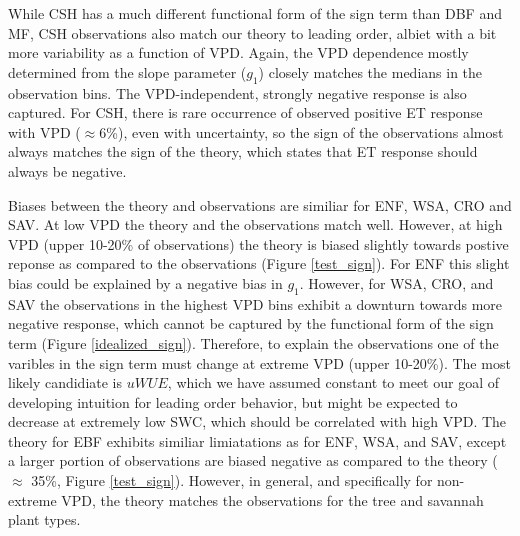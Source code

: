 \documentclass[draft,linenumbers]{agujournal}
\begin{document}
While CSH has a much different functional form of the sign term than DBF and MF, CSH observations also match our theory to leading order, albiet with a bit more variability as a function of VPD. Again, the VPD dependence mostly determined from the slope parameter ($g_1$) closely matches the medians in the observation bins. The VPD-independent, strongly negative response is also captured. For CSH, there is rare occurrence of observed positive ET response with VPD ($\approx 6$\%), even with uncertainty, so the sign of the observations almost always matches the sign of the theory, which states that ET response should always be negative.

Biases between the theory and observations are similiar for ENF, WSA, CRO and SAV. At low VPD the theory and the observations match well. However, at high VPD (upper 10-20\% of observations) the theory is biased slightly towards postive reponse as compared to the observations (Figure \ref{test_sign}). For ENF this slight bias could be explained by a negative bias in $g_1$. However, for WSA, CRO, and SAV the observations in the highest VPD bins exhibit a downturn towards more negative response, which cannot be captured by the functional form of the sign term (Figure \ref{idealized_sign}). Therefore, to explain the observations one of the varibles in the sign term must change at extreme VPD (upper 10-20\%). The most likely candidiate is $uWUE$, which we have assumed constant to meet our goal of developing intuition for leading order behavior, but might be expected to decrease at extremely low SWC, which should be correlated with high VPD. The theory for EBF exhibits similiar limiatations as for ENF, WSA, and SAV, except a larger portion of observations are biased negative as compared to the theory ($\approx$ 35\%, Figure \ref{test_sign}). However, in general, and specifically for non-extreme VPD, the theory matches the observations for the tree and savannah plant types.
\end{document}

